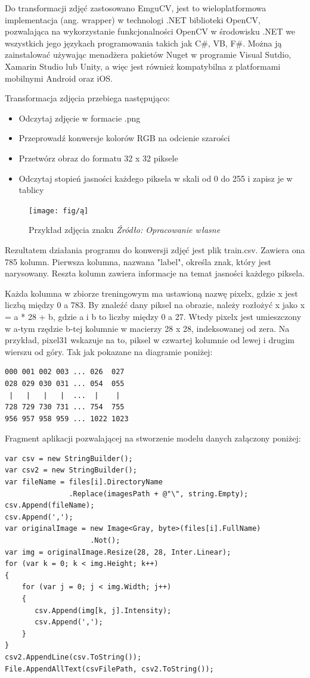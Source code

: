 \documentclass[brudnopis]{xmgr}
\begin{document}
Do transformacji zdjęć zastosowano EmguCV\cite{18}, jest to wieloplatformowa implementacja (ang. wrapper) w technologi .NET biblioteki OpenCV, pozwalająca na wykorzystanie funkcjonalności OpenCV w środowisku .NET we wszystkich jego językach programowania takich jak C\#, VB, F\#\cite{1}. Można ją zainstalować używając menadżera pakietów Nuget w programie Visual Sutdio, Xamarin Studio lub Unity, a więc jest również kompatybilna z platformami mobilnymi Android oraz iOS.

Transformacja zdjęcia przebiega następująco:
\begin{itemize}
\item
Odczytaj zdjęcie w formacie .png
\item
Przeprowadź konwersje kolorów RGB na odcienie szarości
\item
Przetwórz obraz do formatu 32 x 32 piksele
\item
Odczytaj stopień jasności każdego piksela w skali od 0 do 255 i zapisz je w tablicy
\end{itemize}

\begin{figure}[!tbh]
\centering
\texttt{[image: fig/ą]}
\caption{Przykład zdjęcia znaku \emph{Źródło: Opracowanie własne}}
\end{figure}
Rezultatem działania programu do konwersji zdjęć jest plik train.csv. Zawiera ona 785 kolumn. Pierwsza kolumna, nazwana "label", określa znak, który jest narysowany. Reszta kolumn zawiera informacje na temat jasności każdego piksela.

Każda kolumna w zbiorze treningowym ma ustawioną nazwę pixelx, gdzie x jest liczbą między 0 a 783. By znaleźć dany piksel na obrazie, należy rozłożyć x jako x = a * 28 + b, gdzie a i b to liczby między 0 a 27. Wtedy pixelx jest umieszczony w a-tym rzędzie b-tej kolumnie w macierzy 28 x 28, indeksowanej od zera. Na przykład, pixel31 wskazuje na to, piksel w czwartej kolumnie od lewej i drugim wierszu od góry. Tak jak pokazane na diagramie poniżej:

\begin{lstlisting}
000 001 002 003 ... 026  027
028 029 030 031 ... 054  055
 |   |   |   |  ...  |    |
728 729 730 731 ... 754  755
956 957 958 959 ... 1022 1023 
\end{lstlisting} 
\newpage

Fragment aplikacji pozwalającej na stworzenie modelu danych załączony poniżej:

\begin{verbatim}
var csv = new StringBuilder();
var csv2 = new StringBuilder();
var fileName = files[i].DirectoryName
               .Replace(imagesPath + @"\", string.Empty);
csv.Append(fileName);
csv.Append(',');
var originalImage = new Image<Gray, byte>(files[i].FullName)
                    .Not();
var img = originalImage.Resize(28, 28, Inter.Linear);
for (var k = 0; k < img.Height; k++)
{
    for (var j = 0; j < img.Width; j++)
    {
       csv.Append(img[k, j].Intensity);
       csv.Append(',');
    }
}
csv2.AppendLine(csv.ToString());
File.AppendAllText(csvFilePath, csv2.ToString());
\end{verbatim}
\end{document}
